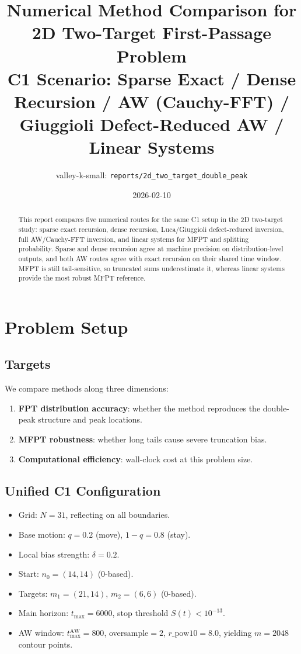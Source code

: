 \documentclass[11pt,a4paper]{article}
\title{Numerical Method Comparison for 2D Two-Target First-Passage Problem\\
\large C1 Scenario: Sparse Exact / Dense Recursion / AW (Cauchy-FFT) / Giuggioli Defect-Reduced AW / Linear Systems}
\author{valley-k-small: \texttt{reports/2d\_two\_target\_double\_peak}}
\date{2026-02-10}
\begin{document}
\sloppy
\maketitle

\begin{abstract}
This report compares five numerical routes for the same C1 setup in the 2D
two-target study: sparse exact recursion, dense recursion, Luca/Giuggioli
defect-reduced inversion, full AW/Cauchy-FFT inversion, and linear systems
for MFPT and splitting probability.
Sparse and dense recursion agree at machine precision on distribution-level
outputs, and both AW routes agree with exact recursion on their shared time
window. MFPT is still tail-sensitive, so truncated sums underestimate it,
whereas linear systems provide the most robust MFPT reference.
\end{abstract}

\section{Problem Setup}
\subsection{Targets}
We compare methods along three dimensions:
\begin{enumerate}[leftmargin=2em]
  \item \textbf{FPT distribution accuracy}: whether the method reproduces the double-peak structure and peak locations.
  \item \textbf{MFPT robustness}: whether long tails cause severe truncation bias.
  \item \textbf{Computational efficiency}: wall-clock cost at this problem size.
\end{enumerate}

\subsection{Unified C1 Configuration}
\begin{itemize}[leftmargin=2em]
  \item Grid: $N=31$, reflecting on all boundaries.
  \item Base motion: $q=0.2$ (move), $1-q=0.8$ (stay).
  \item Local bias strength: $\delta=0.2$.
  \item Start: $n_0=(14,14)$ (0-based).
  \item Targets: $m_1=(21,14)$, $m_2=(6,6)$ (0-based).
  \item Main horizon: $t_{\max}=6000$, stop threshold $S(t)<10^{-13}$.
  \item AW window: $t_{\max}^{\mathrm{AW}}=800$, oversample$=2$, $r\_\text{pow10}=8.0$, yielding $m=2048$ contour points.
\end{itemize}
\end{document}
